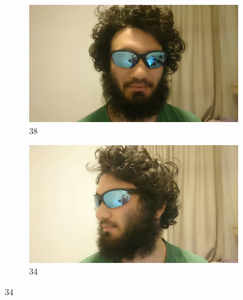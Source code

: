 \documentclass[conference,compsoc]{IEEEtran}
\begin{document}
\begin{figure}[h!]
  \centering
  \begin{subfigure}[b]{0.4\linewidth}
    \includegraphics[width=\linewidth]{33.jpeg}
    \caption{38}
  \end{subfigure}
  \begin{subfigure}[b]{0.4\linewidth}
    \includegraphics[width=\linewidth]{44.jpeg}
    \caption{34}
  \end{subfigure}

\end{figure}
\end{document}

